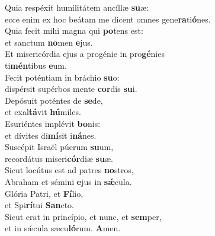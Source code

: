 \oddverse Quia respéxit humilitátem ancíllæ \textbf{su}æ:~\*\\
\oddverse ecce enim ex hoc beátam me dicent omnes gene\textbf{ra}ti\textbf{ó}nes.\\
\evenverse Quia fecit mihi magna qui \textbf{po}tens est:~\*\\
\evenverse et sanctum \textbf{no}men \textbf{e}jus.\\
\oddverse Et misericórdia ejus a progénie in pro\textbf{gé}nies~\*\\
\oddverse ti\textbf{mén}tibus \textbf{e}um.\\
\evenverse Fecit poténtiam in bráchio \textbf{su}o:~\*\\
\evenverse dispérsit supérbos mente \textbf{cor}dis \textbf{su}i.\\
\oddverse Depósuit poténtes de \textbf{se}de,~\*\\
\oddverse et exal\textbf{tá}vit \textbf{hú}miles.\\
\evenverse Esuriéntes implévit \textbf{bo}nis:~\*\\
\evenverse et dívites di\textbf{mí}sit i\textbf{ná}nes.\\
\oddverse Suscépit Israël púerum \textbf{su}um,~\*\\
\oddverse recordátus miseri\textbf{cór}diæ \textbf{su}æ.\\
\evenverse Sicut locútus est ad patres \textbf{no}stros,~\*\\
\evenverse Abraham et sémini \textbf{e}jus in \textbf{sǽ}cula.\\
\oddverse Glória Patri, et \textbf{Fí}lio,~\*\\
\oddverse et Spi\textbf{rí}tui \textbf{San}cto.\\
\evenverse Sicut erat in princípio, et nunc, et \textbf{sem}per,~\*\\
\evenverse et in sǽcula sæcu\textbf{ló}rum. \textbf{A}men.\\
